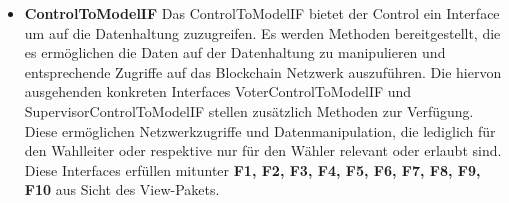 \documentclass[parskip=full]{scrartcl}
\newcommand{\fakeparagraph}[1]{\textbf{#1}}
\begin{document}
	\begin{itemize}
	\item\fakeparagraph{ControlToModelIF} Das ControlToModelIF bietet der Control ein Interface um auf die Datenhaltung zuzugreifen.
	Es werden Methoden bereitgestellt, die es ermöglichen die Daten auf der Datenhaltung zu manipulieren und entsprechende Zugriffe auf das Blockchain Netzwerk auszuführen.
	Die hiervon ausgehenden konkreten Interfaces VoterControlToModelIF und SupervisorControlToModelIF stellen zusätzlich Methoden zur Verfügung. Diese ermöglichen Netzwerkzugriffe und Datenmanipulation, die lediglich für den Wahlleiter oder respektive nur für den Wähler relevant oder erlaubt sind.
	Diese Interfaces erfüllen mitunter \textbf{F1, F2, F3, F4, F5, F6, F7, F8, F9, F10} aus Sicht des View-Pakets.
	\end{itemize} 
\end{document}
